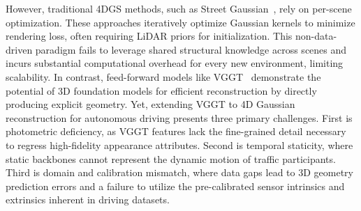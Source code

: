 However, traditional 4DGS methods, such as Street Gaussian~\cite{yan2024street}, rely on per-scene optimization. These approaches iteratively optimize Gaussian kernels to minimize rendering loss, often requiring LiDAR priors for initialization. This non-data-driven paradigm fails to leverage shared structural knowledge across scenes and incurs substantial computational overhead for every new environment, limiting scalability. In contrast, feed-forward models like VGGT~\cite{wang2025vggt} demonstrate the potential of 3D foundation models for efficient reconstruction by directly producing explicit geometry. Yet, extending VGGT to 4D Gaussian reconstruction for autonomous driving presents three primary challenges. First is photometric deficiency, as VGGT features lack the fine-grained detail necessary to regress high-fidelity appearance attributes. Second is temporal staticity, where static backbones cannot represent the dynamic motion of traffic participants. Third is domain and calibration mismatch, where data gaps lead to 3D geometry prediction errors and a failure to utilize the pre-calibrated sensor intrinsics and extrinsics inherent in driving datasets.


